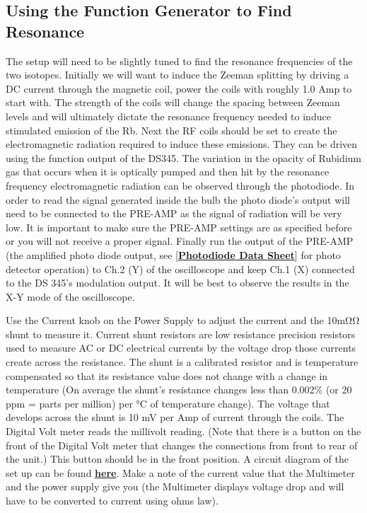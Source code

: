\documentclass{../lab}
\newcommand{\PhotodiodeDataSheet}{http://physics111.lib.berkeley.edu/Physics111/Reprints/OPT/Photodiodes-10DP.pdf}
\newcommand{\CircuitForMagneticCoils}{http://experimentationlab.berkeley.edu/sites/default/files/OPT/Circuitformagnetic\%20coils.png}
\begin{document}
\subsection{Using the Function Generator to Find Resonance}

The setup will need to be slightly tuned to find the resonance frequencies of the two isotopes. Initially we will want to induce the Zeeman splitting by driving a DC current through the magnetic coil, power the coils with roughly 1.0 Amp to start with. The strength of the coils will change the spacing between Zeeman levels and will ultimately dictate the resonance frequency needed to induce stimulated emission of the Rb. Next the RF coils should be set to create the electromagnetic radiation required to induce these emissions. They can be driven using the function output of the DS345. The variation in the opacity of Rubidium gas that occurs when it is optically pumped and then hit by the resonance frequency electromagnetic radiation can be observed through the photodiode. In order to read the signal generated inside the bulb the photo diode's output will need to be connected to the PRE-AMP as the signal of radiation will be very low. It is important to make sure the PRE-AMP settings are as specified before or you will not receive a proper signal. Finally run the output of the PRE-AMP (the amplified photo diode output, see [\href{\PhotodiodeDataSheet}{\textbf{Photodiode Data Sheet}}] for photo detector operation) to Ch.2 (Y) of the oscilloscope and keep Ch.1 (X) connected to the DS 345's modulation output. It will be best to observe the results in the X-Y mode of the oscilloscope. \\

\newpage

Use the Current knob on the Power Supply to adjust the current and the 10mΩΩ shunt to measure it. Current shunt resistors are low resistance precision resistors used to measure AC or DC electrical currents by the voltage drop those currents create across the resistance. The shunt is a calibrated resistor and is temperature compensated so that its resistance value does not change with a change in temperature (On average the shunt's resistance changes less than 0.002\% (or 20 ppm = parts per million) per °C of temperature change). The voltage that develops across the shunt is 10 mV per Amp of current through the coils. The Digital Volt meter reads the millivolt reading. (Note that there is a button on the front of the Digital Volt meter that changes the connections from front to rear of the unit.) This button should be in the front position. A circuit diagram of the set up can be found \href{\CircuitForMagneticCoils}{\textbf{here}}. Make a note of the current value that the Multimeter and the power supply give you (the Multimeter displays voltage drop and will have to be converted to current using ohms law).
\end{document}
